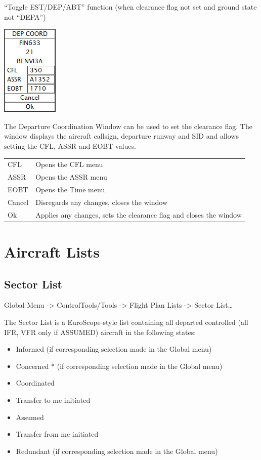 \documentclass[11pt,a4paper]{memoir}
\begin{document}
“Toggle EST/DEP/ABT” function (when clearance flag not set and ground state not “DEPA”)

\includegraphics{img/dcw.png}

The Departure Coordination Window can be used to set the clearance flag. The window displays the aircraft callsign, departure runway and SID and allows setting the CFL, ASSR and EOBT values.

\begin{tabular}{l l}
    CFL     & Opens the CFL menu\\
    ASSR    & Opens the ASSR menu\\
    EOBT    & Opens the Time menu\\
    Cancel  & Disregards any changes, closes the window\\
    Ok      & Applies any changes, sets the clearance flag and closes the window\\
\end{tabular}

\section{Aircraft Lists}

\subsection{Sector List}
\label{list:sector}

Global Menu -> ControlTools/Tools -> Flight Plan Lists -> Sector List…

The Sector List is a EuroScope-style list containing all departed controlled (all IFR, VFR only if ASSUMED) aircraft in the following states:

\begin{itemize}
    \item Informed (if corresponding selection made in the Global menu)
    \item Concerned * (if corresponding selection made in the Global menu)
    \item Coordinated
    \item Transfer to me initiated
    \item Assumed
    \item Transfer from me initiated
    \item Redundant (if corresponding selection made in the Global menu)
\end{itemize}
\end{document}
